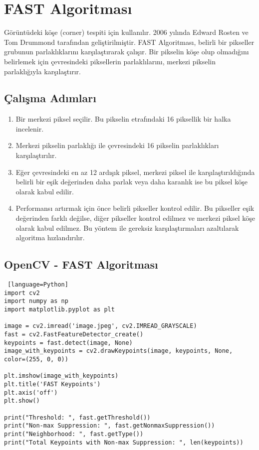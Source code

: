 \section{FAST Algoritması}

Görüntüdeki köşe (corner) tespiti için kullanılır. 2006 yılında Edward Rosten ve Tom Drummond tarafından geliştirilmiştir. FAST Algoritması, belirli bir pikseller grubunun parlaklıklarını karşılaştırarak çalışır. Bir pikselin köşe olup olmadığını belirlemek için çevresindeki piksellerin parlaklılarını, merkezi pikselin parlaklığıyla karşılaştırır.

\subsection{Çalışma Adımları}
\begin{enumerate}
	\item Bir merkezi piksel seçilir. Bu pikselin etrafındaki 16 piksellik bir halka incelenir.
	\item Merkezi pikselin parlaklığı ile çevresindeki 16 pikselin parlaklıkları karşılaştırılır.
	\item Eğer çevresindeki en az 12 ardışık piksel, merkezi piksel ile karşılaştırıldığında belirli bir eşik değerinden daha parlak veya daha karanlık ise bu piksel köşe olarak kabul edilir.
	\item Performansı artırmak için önce belirli pikseller kontrol edilir. Bu pikseller eşik değerinden  farklı değilse, diğer pikseller kontrol edilmez ve merkezi piksel köşe olarak kabul edilmez. Bu yöntem ile gereksiz karşılaştırmaları azaltılarak algoritma hızlandırılır.
\end{enumerate}

\subsection{OpenCV - FAST Algoritması}
\begin{lstlisting} [language=Python]
import cv2
import numpy as np
import matplotlib.pyplot as plt

image = cv2.imread('image.jpeg', cv2.IMREAD_GRAYSCALE)
fast = cv2.FastFeatureDetector_create()
keypoints = fast.detect(image, None)
image_with_keypoints = cv2.drawKeypoints(image, keypoints, None, color=(255, 0, 0))

plt.imshow(image_with_keypoints)
plt.title('FAST Keypoints')
plt.axis('off')
plt.show()

print("Threshold: ", fast.getThreshold())
print("Non-max Suppression: ", fast.getNonmaxSuppression())
print("Neighborhood: ", fast.getType())
print("Total Keypoints with Non-max Suppression: ", len(keypoints))
\end{lstlisting}

\newpage